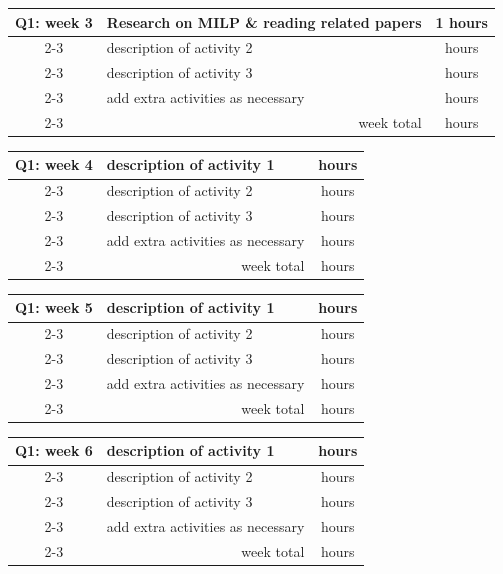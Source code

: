 \documentclass[report,english,cleveref,autoref]{lipics-v2021}
\begin{document}
\begin{tabular}{c| m{10cm}|c}
\hline\hline
Q1: week 3  & Research on MILP \& reading related papers & 1 hours \\
\cline{2-3}
     & description of activity 2 & hours \\
\cline{2-3}
     & description of activity 3 & hours \\
\cline{2-3}
     & add extra activities as necessary & hours \\
\cline{2-3}
     & \multicolumn{1}{r|}{week total} & hours \\
\hline \hline
\end{tabular}
\medskip

\begin{tabular}{c| m{10cm}|c}
\hline\hline
Q1: week 4  & description of activity 1 & hours \\
\cline{2-3}
     & description of activity 2 & hours \\
\cline{2-3}
     & description of activity 3 & hours \\
\cline{2-3}
     & add extra activities as necessary & hours \\
\cline{2-3}
     & \multicolumn{1}{r|}{week total} & hours \\
\hline \hline
\end{tabular}
\medskip

\begin{tabular}{c| m{10cm}|c}
\hline\hline
Q1: week 5  & description of activity 1 & hours \\
\cline{2-3}
     & description of activity 2 & hours \\
\cline{2-3}
     & description of activity 3 & hours \\
\cline{2-3}
     & add extra activities as necessary & hours \\
\cline{2-3}
     & \multicolumn{1}{r|}{week total} & hours \\
\hline \hline
\end{tabular}
\medskip

\begin{tabular}{c| m{10cm}|c}
\hline\hline
Q1: week 6  & description of activity 1 & hours \\
\cline{2-3}
     & description of activity 2 & hours \\
\cline{2-3}
     & description of activity 3 & hours \\
\cline{2-3}
     & add extra activities as necessary & hours \\
\cline{2-3}
     & \multicolumn{1}{r|}{week total} & hours \\
\hline \hline
\end{tabular}
\medskip
\end{document}
